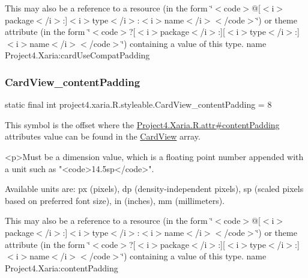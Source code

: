 This may also be a reference to a resource (in the form \char`\"{}$<$code$>$@\mbox{[}$<$i$>$package$<$/i$>$\+:\mbox{]}$<$i$>$type$<$/i$>$\+:$<$i$>$name$<$/i$>$$<$/code$>$\char`\"{}) or theme attribute (in the form \char`\"{}$<$code$>$?\mbox{[}$<$i$>$package$<$/i$>$\+:\mbox{]}\mbox{[}$<$i$>$type$<$/i$>$\+:\mbox{]}$<$i$>$name$<$/i$>$$<$/code$>$\char`\"{}) containing a value of this type.  name Project4.\+Xaria\+:card\+Use\+Compat\+Padding \mbox{\label{classproject4_1_1xaria_1_1R_1_1styleable_a870488b5d76324f10a774fa2fd3498c8}} 
\subsubsection{\texorpdfstring{Card\+View\+\_\+content\+Padding}{CardView\_contentPadding}}
{\footnotesize\ttfamily static final int project4.\+xaria.\+R.\+styleable.\+Card\+View\+\_\+content\+Padding = 8\hspace{0.3cm}{\ttfamily [static]}}

This symbol is the offset where the \hyperlink{}{Project4.\+Xaria.\+R.\+attr\#content\+Padding} attribute\textquotesingle{}s value can be found in the \hyperlink{classproject4_1_1xaria_1_1R_1_1styleable_abef2e3d3e2b11dd786470094dbc57ea4}{Card\+View} array.

\begin{DoxyVerb}      <p>Must be a dimension value, which is a floating point number appended with a unit such as "<code>14.5sp</code>".
\end{DoxyVerb}
 Available units are\+: px (pixels), dp (density-\/independent pixels), sp (scaled pixels based on preferred font size), in (inches), mm (millimeters). 

This may also be a reference to a resource (in the form \char`\"{}$<$code$>$@\mbox{[}$<$i$>$package$<$/i$>$\+:\mbox{]}$<$i$>$type$<$/i$>$\+:$<$i$>$name$<$/i$>$$<$/code$>$\char`\"{}) or theme attribute (in the form \char`\"{}$<$code$>$?\mbox{[}$<$i$>$package$<$/i$>$\+:\mbox{]}\mbox{[}$<$i$>$type$<$/i$>$\+:\mbox{]}$<$i$>$name$<$/i$>$$<$/code$>$\char`\"{}) containing a value of this type.  name Project4.\+Xaria\+:content\+Padding \mbox{\label{classproject4_1_1xaria_1_1R_1_1styleable_aefde665737e7cce8b5bf40fce5b28dc3}} 
